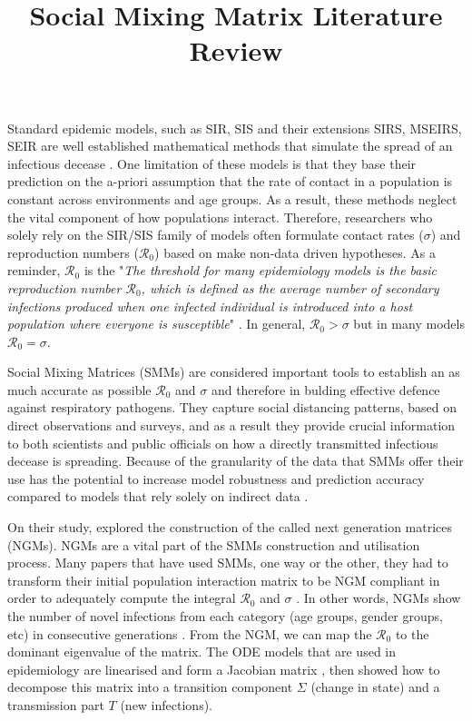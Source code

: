 \documentclass[12pt]{article}
\title{Social Mixing Matrix Literature Review}
\begin{document}
\maketitle

Standard epidemic models, such as SIR, SIS and their extensions  SIRS, MSEIRS, SEIR are well established mathematical methods that simulate the spread of an infectious decease \cite{keeling2008modeling, ma2009mathematical, li2018introduction}. One limitation of these models is that they base their prediction on the a-priori assumption that the rate of contact in a population is constant across environments and age groups. As a result, these methods neglect the vital component of how populations interact. Therefore, researchers who solely rely on the SIR/SIS family of models often formulate contact rates ($\sigma$) and reproduction numbers ($\mathcal{R}_{0} $) based on make non-data driven hypotheses. As a reminder, $\mathcal{R}_{0} $ is the "\textit{The threshold for many epidemiology models is the basic reproduction number $\mathcal{R}_{0}$, which is defined as the average number of secondary infections produced when one infected individual is introduced into a host population where everyone is susceptible}" \cite[p.21]{ma2009mathematical}. In general, $\mathcal{R}_{0} >\sigma$ but in many models $\mathcal{R}_{0} =\sigma$. 

Social Mixing Matrices (SMMs) are considered important tools to establish an as much accurate as possible $\mathcal{R_{0}}$ and $\sigma$ and therefore in bulding effective defence against respiratory pathogens. They capture social distancing patterns, based on direct observations and surveys, and as a result they provide crucial information to both scientists and public officials on how a directly transmitted infectious decease is spreading. Because of the granularity of the data that SMMs offer their use has the potential to increase model robustness and prediction accuracy compared to models that rely solely on indirect data \cite{Mossong:2008, Baguelin:2013}. 

On their study, \cite{Diekmann:2010} explored the construction of the called next generation matrices (NGMs). NGMs are a vital part of the SMMs construction and utilisation process. Many papers that have used SMMs, one way or the other, they had to transform their initial population interaction matrix to be NGM compliant in order to adequately compute the integral $\mathcal{R}_{0} $ and $\sigma$ \cite{Mossong:2008, Fumanelli:2012, Klepac2020}. In other words, NGMs show the number of novel infections from each category (age groups, gender groups, etc) in consecutive generations \cite[p.874]{Diekmann:2010}. From the NGM, we can map the $\mathcal{R}_{0}$ to the dominant eigenvalue of the matrix. The ODE models that are used in epidemiology are linearised and form a Jacobian matrix \cite[Section 2.1.2]{keeling2008modeling}, then \cite{Diekmann:2010} showed how to decompose this matrix into a transition component $\Sigma$ (change in state) and a transmission part $T$ (new infections). 
\end{document}
